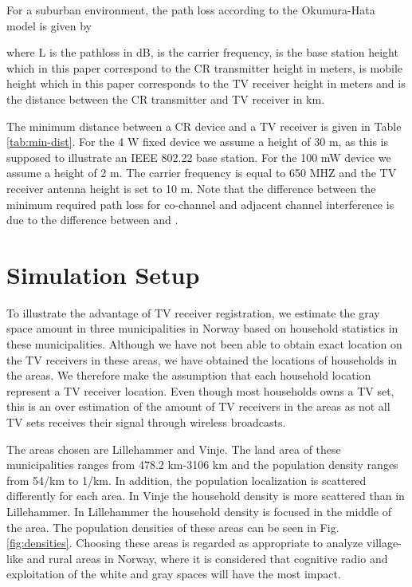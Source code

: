 \documentclass[journal,11pt,draftclsnofoot,onecolumn]{IEEEtran}
\begin{document}
For a suburban environment, the path loss according to the Okumura-Hata model is given by

where L is the pathloss in dB,  is the carrier frequency,  is the base station height which in this paper correspond to the CR transmitter height in meters,  is mobile height which in this paper corresponds to the TV receiver height in meters and  is the distance between the CR transmitter and TV receiver in km.


The minimum distance between a CR device and a TV receiver is given in Table \ref{tab:min-dist}. For the 4 W fixed device we assume a height of 30 m, as this is supposed to illustrate an IEEE 802.22 base station. For the 100 mW device we assume a height of 2 m. The carrier frequency is equal to 650 MHZ and the TV receiver antenna height is set to 10 m. Note that the difference between the minimum required path loss for co-channel and adjacent channel interference is due to the difference between  and .

\section{Simulation Setup}
\label{sec:sim-setup}
To illustrate the advantage of TV receiver registration, we estimate the gray space amount in three municipalities in Norway based on household statistics in these municipalities. Although we have not been able to obtain exact location on the TV receivers in these areas, we have obtained the locations of households in the areas. We therefore make the assumption that each household location represent a TV receiver location. Even though most households owns a TV set, this is an over estimation of the amount of TV receivers in the areas as not all TV sets receives their signal through wireless broadcasts.

The areas chosen are Lillehammer and Vinje. The land area of these municipalities ranges from 478.2 km-3106 km and the population density ranges from 54/km to 1/km. In addition, the population localization is scattered differently for each area. In Vinje the household density is more scattered than in Lillehammer. In Lillehammer the household density is focused in the middle of the area. The population densities of these areas can be seen in Fig. \ref{fig:densities}. Choosing these areas is regarded as appropriate to analyze village-like and rural areas in Norway, where it is considered that cognitive radio and exploitation of the white and gray spaces will have the most impact.
\end{document}
